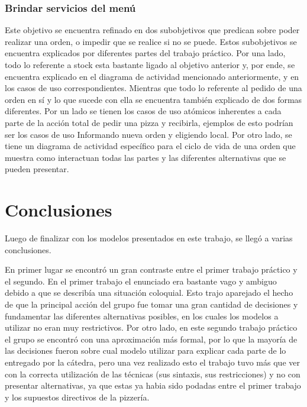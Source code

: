 \documentclass[a4paper,10pt]{article}
\begin{document}
\subsubsection*{Brindar servicios del men\'u}

Este objetivo se encuentra refinado en dos subobjetivos que predican sobre poder realizar una orden, o impedir que se realice si no se puede.
Estos subobjetivos se encuentra explicados por diferentes partes del trabajo pr\'actico. Por una lado, todo lo referente a stock esta bastante
ligado al objetivo anterior y, por ende, se encuentra explicado en el diagrama de actividad mencionado anteriormente, y en los casos de uso correspondientes.
Mientras que todo lo referente al pedido de una orden en s\'i y lo que sucede con ella se encuentra tambi\'en explicado de dos formas diferentes.
Por un lado se tienen los casos de uso at\'omicos inherentes a cada parte de la acci\'on total de pedir una pizza y recibirla, ejemplos de esto
podr\'ian ser los casos de uso Informando nueva orden y eligiendo local. Por otro lado, se tiene un diagrama de actividad espec\'ifico para el
ciclo de vida de una orden que muestra como interactuan todas las partes y las diferentes alternativas que se pueden presentar.


\newpage
\section*{Conclusiones}


Luego de finalizar con los modelos presentados en este trabajo, se lleg\'o a varias conclusiones.

En primer lugar se encontr\'o un gran contraste entre el primer trabajo pr\'actico y el segundo.
En el primer trabajo el enunciado era bastante vago y ambiguo debido a que se describ\'ia una situaci\'on coloquial. Esto
trajo aparejado el hecho de que la principal acci\'on del grupo fue tomar una gran cantidad de decisiones y fundamentar las diferentes
alternativas posibles, en los cuales los modelos a utilizar no eran muy restrictivos. Por otro lado, en este segundo trabajo pr\'actico el grupo se encontr\'o
con una aproximaci\'on m\'as formal, por lo que la mayor\'ia de las decisiones fueron sobre cual modelo utilizar para explicar cada parte de lo
entregado por la c\'atedra, pero una vez realizado esto el trabajo tuvo m\'as que ver con la correcta utilizaci\'on de las t\'ecnicas (sus sintaxis, sus restricciones)
y no con presentar alternativas, ya que estas ya habia sido podadas entre el primer trabajo y los supuestos directivos de la pizzer\'ia.
\end{document}
